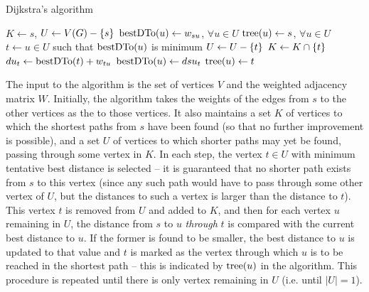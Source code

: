 \begin{algorithm}\caption{Dijkstra's algorithm}\label{alg:Dijkstra}
\begin{algorithmic}[1]
	\State $K \gets {s}$, $U \gets V(G) - \qty{s}$
	\State $\operatorname{bestDTo}(u) \gets w_{su}$, $\forall u \in U$
	\State $\operatorname{tree}(u) \gets s$, $\forall u \in U$
		\State $t \gets u \in U$ such that $\operatorname{bestDTo}(u)$ is minimum
		\State $U \gets U - \qty{t}$ 
		\State $K \gets K \cap \qty{t}$ 
			\State $du_t \gets \operatorname{bestDTo}(t) + w_{tu}$ 
				\State $\operatorname{bestDTo}(u) \gets dsu_t$
				\State $\operatorname{tree}(u) \gets t$
			\EndIf
		\EndFor
	\EndWhile
\end{algorithmic}
\end{algorithm}


The input to the algorithm is the set of vertices $V$ and the weighted adjacency matrix $W$. Initially, the algorithm takes the weights of the edges from $s$ to the other vertices as the  to those vertices. It also maintains a set $K$ of vertices to which the shortest paths from $s$ have been found (so that no further improvement is possible), and a set $U$ of vertices to which shorter paths may yet be found, passing through some vertex in $K$. In each step, the vertex $t \in U$ with minimum tentative best distance is selected -- it is guaranteed that no shorter path exists from $s$ to this vertex (since any such path would have to pass through some other vertex of $U$, but the distances to such a vertex is larger than the distance to $t$). This vertex $t$ is removed from $U$ and added to $K$, and then for each vertex $u$ remaining in $U$, the distance from $s$ to $u$ \emph{through} $t$ is compared with the current best distance to $u$. If the former is found to be smaller, the best distance to $u$ is updated to that value and $t$ is marked as the vertex through which $u$ is to be reached in the shortest path -- this is indicated by $\operatorname{tree}(u)$ in the algorithm. This procedure is repeated until there is only vertex remaining in $U$ (i.e. until $|U| = 1$).


